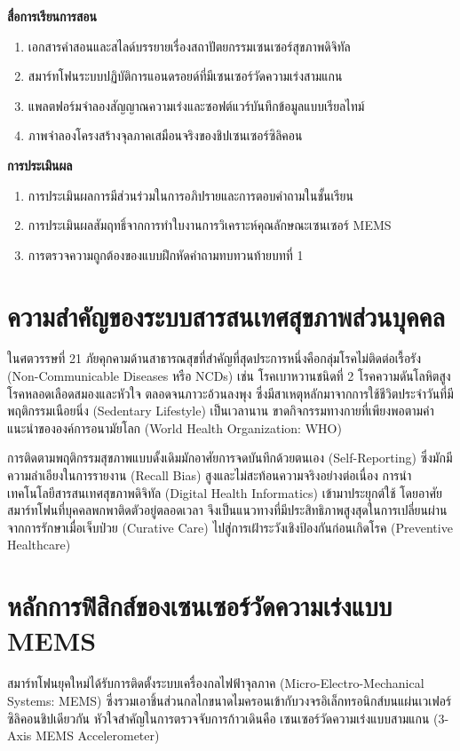 \noindent\textbf{สื่อการเรียนการสอน}
\begin{enumerate}
    \item เอกสารคำสอนและสไลด์บรรยายเรื่องสถาปัตยกรรมเซนเซอร์สุขภาพดิจิทัล
    \item สมาร์ทโฟนระบบปฏิบัติการแอนดรอยด์ที่มีเซนเซอร์วัดความเร่งสามแกน
    \item แพลตฟอร์มจำลองสัญญาณความเร่งและซอฟต์แวร์บันทึกข้อมูลแบบเรียลไทม์
    \item ภาพจำลองโครงสร้างจุลภาคเสมือนจริงของชิปเซนเซอร์ซิลิคอน
\end{enumerate}

\noindent\textbf{การประเมินผล}
\begin{enumerate}
    \item การประเมินผลการมีส่วนร่วมในการอภิปรายและการตอบคำถามในชั้นเรียน
    \item การประเมินผลสัมฤทธิ์จากการทำใบงานการวิเคราะห์คุณลักษณะเซนเซอร์ MEMS
    \item การตรวจความถูกต้องของแบบฝึกหัดคำถามทบทวนท้ายบทที่ 1
\end{enumerate}

\newpage

\section{ความสำคัญของระบบสารสนเทศสุขภาพส่วนบุคคล}
ในศตวรรษที่ 21 ภัยคุกคามด้านสาธารณสุขที่สำคัญที่สุดประการหนึ่งคือกลุ่มโรคไม่ติดต่อเรื้อรัง (Non-Communicable Diseases หรือ NCDs) เช่น โรคเบาหวานชนิดที่ 2 โรคความดันโลหิตสูง โรคหลอดเลือดสมองและหัวใจ ตลอดจนภาวะอ้วนลงพุง ซึ่งมีสาเหตุหลักมาจากการใช้ชีวิตประจำวันที่มีพฤติกรรมเนือยนิ่ง (Sedentary Lifestyle) เป็นเวลานาน ขาดกิจกรรมทางกายที่เพียงพอตามคำแนะนำขององค์การอนามัยโลก (World Health Organization: WHO)

การติดตามพฤติกรรมสุขภาพแบบดั้งเดิมมักอาศัยการจดบันทึกด้วยตนเอง (Self-Reporting) ซึ่งมักมีความลำเอียงในการรายงาน (Recall Bias) สูงและไม่สะท้อนความจริงอย่างต่อเนื่อง การนำเทคโนโลยีสารสนเทศสุขภาพดิจิทัล (Digital Health Informatics) เข้ามาประยุกต์ใช้ โดยอาศัยสมาร์ทโฟนที่บุคคลพกพาติดตัวอยู่ตลอดเวลา จึงเป็นแนวทางที่มีประสิทธิภาพสูงสุดในการเปลี่ยนผ่านจากการรักษาเมื่อเจ็บป่วย (Curative Care) ไปสู่การเฝ้าระวังเชิงป้องกันก่อนเกิดโรค (Preventive Healthcare)

\section{หลักการฟิสิกส์ของเซนเซอร์วัดความเร่งแบบ MEMS}
สมาร์ทโฟนยุคใหม่ได้รับการติดตั้งระบบเครื่องกลไฟฟ้าจุลภาค (Micro-Electro-Mechanical Systems: MEMS) ซึ่งรวมเอาชิ้นส่วนกลไกขนาดไมครอนเข้ากับวงจรอิเล็กทรอนิกส์บนแผ่นเวเฟอร์ซิลิคอนชิปเดียวกัน หัวใจสำคัญในการตรวจจับการก้าวเดินคือ เซนเซอร์วัดความเร่งแบบสามแกน (3-Axis MEMS Accelerometer)

